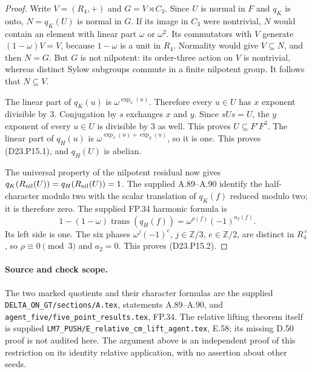 \begin{proof}
Write $V=(R_4,+)$ and $G=V\rtimes C_3$. Since $U$ is normal in
$F$ and $q_K$ is onto, $N=q_K(U)$ is normal in $G$. If its image
in $C_3$ were nontrivial, $N$ would contain an element with linear
part $\omega$ or $\omega^2$. Its commutators with $V$ generate
$(1-\omega)V=V$, because $1-\omega$ is a unit in $R_4$.
Normality would give $V\subseteq N$, and then $N=G$. But $G$
is not nilpotent: its order-three action on $V$ is nontrivial,
whereas distinct Sylow subgroups commute in a finite nilpotent
group. It follows that $N\subseteq V$.

The linear part of $q_K(u)$ is $\omega^{\operatorname{exp}_x(u)}$.
Therefore every $u\in U$ has $x$ exponent divisible by $3$.
Conjugation by $s$ exchanges $x$ and $y$. Since $sUs=U$, the
$y$ exponent of every $u\in U$ is divisible by $3$ as well.
This proves $U\subseteq F'F^3$. The linear part of $q_H(u)$ is
$\omega^{\operatorname{exp}_x(u)+\operatorname{exp}_y(u)}$, so
it is one. This proves (D23.P15.1), and $q_H(U)$ is abelian.

The universal property of the nilpotent residual now gives
$q_K(R_{\rm nil}(U))=q_H(R_{\rm nil}(U))=1$.
The supplied A.89--A.90 identify the half-character modulo two
with the scalar translation of $q_K(f)$ reduced modulo two;
it is therefore zero. The supplied FP.34 harmonic formula is
\[
 1-(1-\omega)\operatorname{trans}(q_H(f))
       =\omega^{\rho(f)}(-1)^{a_2(f)}.
\]
Its left side is one. The six phases
$\omega^j(-1)^e$, $j\in\mathbb Z/3$, $e\in\mathbb Z/2$, are
distinct in $R_4^\times$, so $\rho\equiv0\pmod3$ and $a_2=0$.
This proves (D23.P15.2).
\end{proof}

\paragraph{Source and check scope.}
The two marked quotients and their character formulas are the
supplied \texttt{DELTA\_ON\_GT/sections/A.tex}, statements
A.89--A.90, and \texttt{agent\_five/five\_point\_results.tex},
FP.34. The relative lifting theorem itself is supplied
\texttt{LM7\_PUSH/E\_relative\_cm\_lift\_agent.tex}, E.58;
its missing D.50 proof is not audited here. The argument above
is an independent proof of this restriction on its identity
relative application, with no assertion about other seeds.
